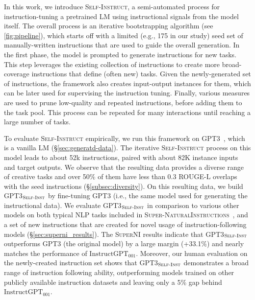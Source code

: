 \documentclass[11pt]{article}
\newcommand{\todo}[1]{{\color{red} [TODO: {#1}]}}
\newcommand{\yeganeh}[1]{\textcolor{magenta}{[YK: #1]}}
\newcommand{\nascomment}[1]{\textcolor{blue}{\textbf{[#1 -- \textsc{nas}]}}}
\newcommand{\name}{\textsc{Self-Instruct}}
\newcommand{\supernat}{\textsc{Super-NaturalInstructions}}
\newcommand{\supernatShort}{\textsc{SuperNI}}
\newcommand{\gptthree}{\textsc{GPT3}}
\newcommand{\gptself}{\textsc{GPT3}$_{\textsc{Self-Inst}}$}
\newcommand{\gptinstruct}[1]{$\text{InstructGPT}_{\text{#1}}$}
\begin{document}
In this work, we introduce \name, a semi-automated process for instruction-tuning a pretrained LM using instructional signals from the model itself. 
The overall process is an iterative bootstrapping algorithm (see \autoref{fig:pipeline}), which starts off with a limited (e.g., 175 in our study) seed set of manually-written instructions that are used to guide the overall generation. 
In the first phase, the model is prompted to generate instructions for new tasks. 
This step leverages the existing collection of instructions to create 
more broad-coverage instructions that define (often new) tasks.
Given the newly-generated set of instructions, the framework also creates input-output instances for them, which can be later used for supervising the instruction tuning. 
Finally, various measures are used to prune low-quality and repeated instructions, before adding them to the task pool. 
This process can be repeated for many interactions until reaching a large number of tasks.


To evaluate \name{} empirically, we run this framework on \gptthree{}~\cite{brown2020gpt3}, which is a vanilla LM (\S\ref{sec:generatd-data}).
The iterative \name{} process on this model leads to about 52k instructions, paired with about 82K instance inputs and target outputs. 
We observe that the resulting data provides a diverse range of creative tasks and over 50\% of them have less than 0.3 ROUGE-L overlaps with the seed instructions (\S\ref{subsec:diversity}).
On this resulting data, we build \gptself{} by fine-tuning \gptthree{} (i.e., the same model used for generating the instructional data). 
We evaluate \gptself{} in comparison to various other models on both typical NLP tasks included in \supernat{}~\cite{wang2022benchmarking}, and a set of new instructions that are created for novel usage of instruction-following models (\S\ref{sec:superni_results}). 
The \supernatShort{} results indicate that 
\gptself{} outperforms \gptthree{} (the original model) by a large margin (+33.1\%) and nearly matches the performance of \gptinstruct{001}. Moreover, our human evaluation on the newly-created instruction set shows that \gptself{} demonstrates a broad range of instruction following ability, outperforming models trained on other publicly available instruction datasets and leaving only a 5\% gap behind \gptinstruct{001}. 
\end{document}
